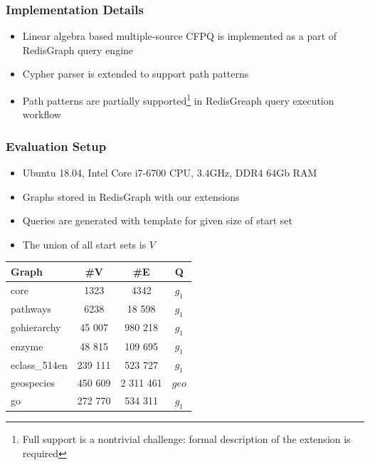 \documentclass[xcolor=table,aspectratio=169]{beamer}
\begin{document}
\begin{frame}[fragile] \frametitle{Implementation Details}
  \begin{itemize}
  \item Linear algebra based multiple-source CFPQ is implemented as a part of RedisGraph query engine
  \item Cypher parser is extended to support path patterns
  \item Path patterns are partially supported\footnote{Full support is a nontrivial challenge: formal description of the extension is required} in RedisGreaph query execution workflow
  \end{itemize}
  
\end{frame}




\begin{frame}[fragile] \frametitle{Evaluation Setup}

\begin{minipage}[t]{0.51\textwidth}
\vspace{-2cm}
\begin{itemize}
  \item Ubuntu 18.04, Intel Core i7-6700 CPU, 3.4GHz, DDR4 64Gb RAM
  \item Graphs stored in RedisGraph with our extensions
  \item Queries are generated with template for given size of start set
  \item The union of all start sets is $V$ 
\end{itemize}

\end{minipage}
\pause
\begin{minipage}[t]{0.44\textwidth}
{
\begin{tabular}{|l|c|c|c|}
\hline
Graph                  & \#V                  & \#E                  & Q     \\
              
\hline
\hline
core                   & 1323                 & 4342                 & $g_1$ \\
pathways               & 6238                 & 18 598               & $g_1$ \\
gohierarchy            & 45 007               & 980 218              & $g_1$ \\
enzyme                 & 48 815               & 109 695              & $g_1$ \\
eclass\_514en          & 239 111              & 523 727              & $g_1$ \\
geospecies             & 450 609              & 2 311 461            & $geo$ \\
go                     & 272 770              & 534 311              & $g_1$ \\
\hline
\end{tabular}
}


\end{minipage}
\end{frame}
\end{document}
